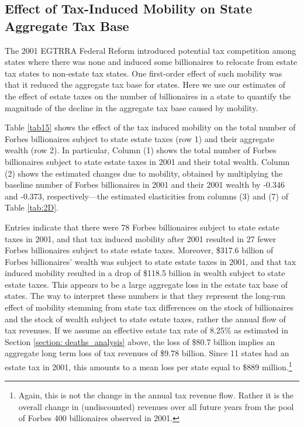 \documentclass[12pt]{article}
\begin{document}
\subsection{Effect of Tax-Induced Mobility on State Aggregate Tax Base}

The 2001 EGTRRA Federal Reform introduced potential tax competition among states where there was none and induced some billionaires to relocate from estate tax states to non-estate tax states.  One first-order effect of such mobility was that it reduced the aggregate tax base for states. Here we use our estimates of the effect of estate taxes on the number of billionaires in a state to quantify the magnitude of the decline in the aggregate tax base caused by mobility. 

Table \ref{tab15}  shows the effect of the tax induced mobility on the total number of Forbes billionaires subject to state estate taxes (row 1) and their aggregate wealth (row 2).  In particular, Column (1) shows the total number of Forbes billionaires subject to state estate taxes in 2001 and their total wealth. 
Column (2) shows the estimated changes due to mobility, obtained by  multiplying the baseline number of Forbes billionaires in 2001 and their 2001 wealth by -0.346 and -0.373, respectively---the estimated elasticities from columns (3) and (7) of Table \ref{tab:2D}. 

Entries indicate that there were 78 Forbes billionaires subject to state estate taxes in 2001, and that tax induced mobility after 2001 resulted in 27 fewer Forbes billionaires subject to state estate taxes. Moreover, \$317.6 billion of Forbes billionaires' wealth was subject to state estate taxes in 2001, and that tax induced mobility resulted in a drop of \$118.5 billion in wealth subject to state estate taxes. This appears to be a large aggregate loss in the estate tax base of states. The way to interpret these numbers is that they represent the long-run effect of mobility stemming from state tax differences on the stock of billionaires and the stock of wealth subject to state estate taxes, rather the annual flow of tax revenues. If we assume an effective estate tax rate of 8.25\% as estimated in Section \ref{section: deaths_analysis} above, the loss of \$80.7 billion implies an aggregate long term loss of tax revenues of \$9.78 billion. Since 11 states had an estate tax in 2001, this amounts to a mean loss per state equal to \$889 million.\footnote{Again, this is not the change in the annual tax revenue flow. Rather it is the overall change in (undiscounted) revenues over all future years from the pool of Forbes 400 billionaires observed in 2001.}    
\end{document}
